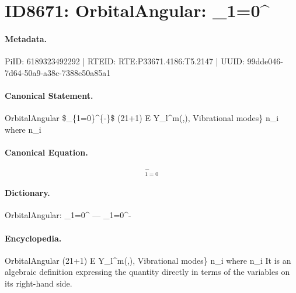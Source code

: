 \section*{ID8671: OrbitalAngular: \_1=0\textasciicircum{}}
\paragraph{Metadata.}
PiID: 6189323492292 | RTEID: RTE:P33671.4186:T5.2147 | UUID: 99dde046-7d64-50a9-a38c-7388e50a85a1

\paragraph{Canonical Statement.}
OrbitalAngular \$\_\{1=0\}\textasciicircum{}\{-\}\$ (21+1) E Y\_l\textasciicircum{}m(,), Vibrational modes\} n\_i where n\_i

\paragraph{Canonical Equation.}
\[
_{1=0}^{-}
\]

\paragraph{Dictionary.}
OrbitalAngular: \_1=0\textasciicircum{} — \_1=0\textasciicircum{}-

\paragraph{Encyclopedia.}
OrbitalAngular (21+1) E Y\_l\textasciicircum{}m(,), Vibrational modes\} n\_i where n\_i It is an algebraic definition expressing the quantity directly in terms of the variables on its right-hand side.

